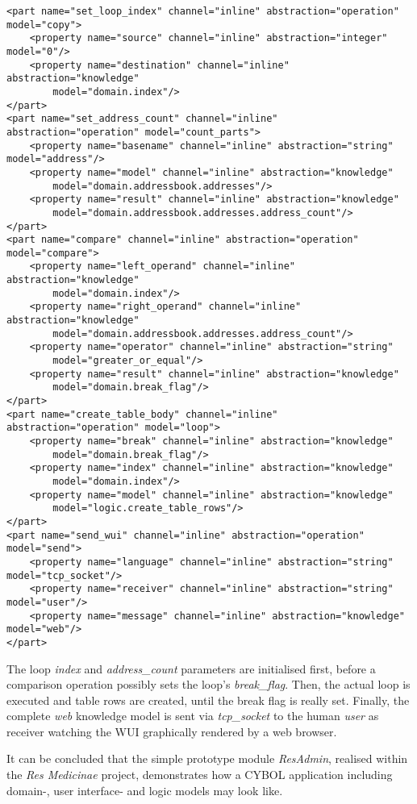 \begin{scriptsize}
    \begin{verbatim}
<part name="set_loop_index" channel="inline" abstraction="operation" model="copy">
    <property name="source" channel="inline" abstraction="integer" model="0"/>
    <property name="destination" channel="inline" abstraction="knowledge"
        model="domain.index"/>
</part>
<part name="set_address_count" channel="inline" abstraction="operation" model="count_parts">
    <property name="basename" channel="inline" abstraction="string" model="address"/>
    <property name="model" channel="inline" abstraction="knowledge"
        model="domain.addressbook.addresses"/>
    <property name="result" channel="inline" abstraction="knowledge"
        model="domain.addressbook.addresses.address_count"/>
</part>
<part name="compare" channel="inline" abstraction="operation" model="compare">
    <property name="left_operand" channel="inline" abstraction="knowledge"
        model="domain.index"/>
    <property name="right_operand" channel="inline" abstraction="knowledge"
        model="domain.addressbook.addresses.address_count"/>
    <property name="operator" channel="inline" abstraction="string"
        model="greater_or_equal"/>
    <property name="result" channel="inline" abstraction="knowledge"
        model="domain.break_flag"/>
</part>
<part name="create_table_body" channel="inline" abstraction="operation" model="loop">
    <property name="break" channel="inline" abstraction="knowledge"
        model="domain.break_flag"/>
    <property name="index" channel="inline" abstraction="knowledge"
        model="domain.index"/>
    <property name="model" channel="inline" abstraction="knowledge"
        model="logic.create_table_rows"/>
</part>
<part name="send_wui" channel="inline" abstraction="operation" model="send">
    <property name="language" channel="inline" abstraction="string" model="tcp_socket"/>
    <property name="receiver" channel="inline" abstraction="string" model="user"/>
    <property name="message" channel="inline" abstraction="knowledge" model="web"/>
</part>
    \end{verbatim}
\end{scriptsize}

The loop \emph{index} and \emph{address\_count} parameters are initialised
first, before a comparison operation possibly sets the loop's
\emph{break\_flag}. Then, the actual loop is executed and table rows are
created, until the break flag is really set. Finally, the complete \emph{web}
knowledge model is sent via \emph{tcp\_socket} to the human \emph{user} as
receiver watching the WUI graphically rendered by a web browser.

It can be concluded that the simple prototype module \emph{ResAdmin}, realised
within the \emph{Res Medicinae} project, demonstrates how a CYBOL application
including domain-, user interface- and logic models may look like.
